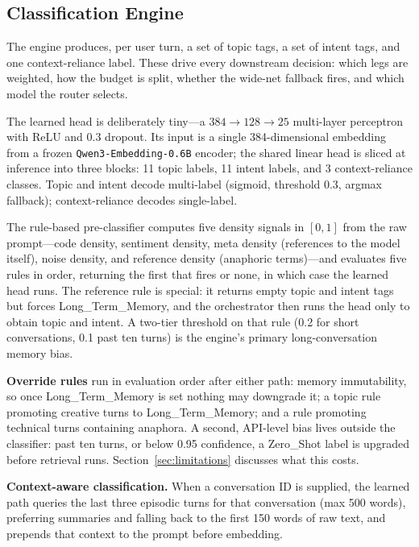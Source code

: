 \documentclass[11pt,a4paper]{article}
\begin{document}
\subsection{Classification Engine}
\label{app:classifier}

The engine produces, per user turn, a set of topic tags, a set of intent tags, and one context-reliance label. These drive every downstream decision: which legs are weighted, how the budget is split, whether the wide-net fallback fires, and which model the router selects.

The learned head is deliberately tiny---a $384 \rightarrow 128 \rightarrow 25$ multi-layer perceptron with ReLU and 0.3 dropout. Its input is a single 384-dimensional embedding from a frozen \texttt{Qwen3-Embedding-0.6B} encoder; the shared linear head is sliced at inference into three blocks: 11 topic labels, 11 intent labels, and 3 context-reliance classes. Topic and intent decode multi-label (sigmoid, threshold 0.3, argmax fallback); context-reliance decodes single-label.

The rule-based pre-classifier computes five density signals in $[0,1]$ from the raw prompt---code density, sentiment density, meta density (references to the model itself), noise density, and reference density (anaphoric terms)---and evaluates five rules in order, returning the first that fires or none, in which case the learned head runs. The reference rule is special: it returns empty topic and intent tags but forces Long\_Term\_Memory, and the orchestrator then runs the head only to obtain topic and intent. A two-tier threshold on that rule (0.2 for short conversations, 0.1 past ten turns) is the engine's primary long-conversation memory bias.

\textbf{Override rules} run in evaluation order after either path: memory immutability, so once Long\_Term\_Memory is set nothing may downgrade it; a topic rule promoting creative turns to Long\_Term\_Memory; and a rule promoting technical turns containing anaphora. A second, API-level bias lives outside the classifier: past ten turns, or below 0.95 confidence, a Zero\_Shot label is upgraded before retrieval runs. Section~\ref{sec:limitations} discusses what this costs.

\textbf{Context-aware classification.} When a conversation ID is supplied, the learned path queries the last three episodic turns for that conversation (max 500 words), preferring summaries and falling back to the first 150 words of raw text, and prepends that context to the prompt before embedding.
\end{document}
